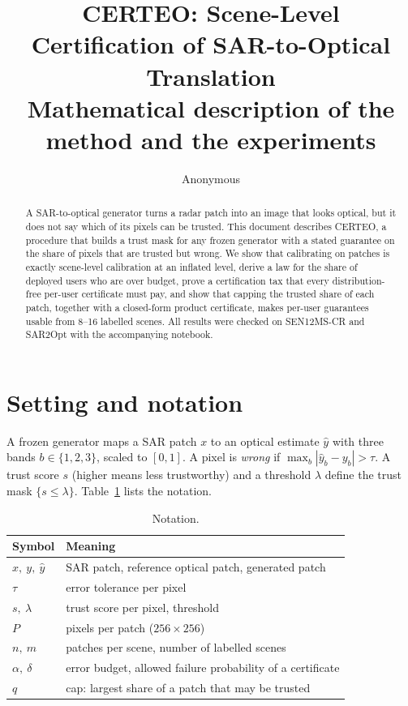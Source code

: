 \documentclass[11pt,a4paper]{article}
\title{CERTEO: Scene-Level Certification of SAR-to-Optical Translation\\[0.4ex]
\large Mathematical description of the method and the experiments}
\author{Anonymous}
\date{}
\theoremstyle{definition}
\theoremstyle{remark}
\newcommand{\1}{\mathbf{1}}
\begin{document}
\maketitle

\begin{abstract}
A SAR-to-optical generator turns a radar patch into an image that looks optical, but it does not say which of its pixels can be trusted. This document describes CERTEO, a procedure that builds a trust mask for any frozen generator with a stated guarantee on the share of pixels that are trusted but wrong. We show that calibrating on patches is exactly scene-level calibration at an inflated level, derive a law for the share of deployed users who are over budget, prove a certification tax that every distribution-free per-user certificate must pay, and show that capping the trusted share of each patch, together with a closed-form product certificate, makes per-user guarantees usable from 8--16 labelled scenes. All results were checked on SEN12MS-CR and SAR2Opt with the accompanying notebook.
\end{abstract}

\tableofcontents

\section{Setting and notation}

A frozen generator maps a SAR patch $x$ to an optical estimate $\hat y$ with three bands $b\in\{1,2,3\}$, scaled to $[0,1]$. A pixel is \emph{wrong} if $\max_b|\hat y_b-y_b|>\tau$. A trust score $s$ (higher means less trustworthy) and a threshold $\lambda$ define the trust mask $\{s\le\lambda\}$. Table~\ref{tab:notation} lists the notation.

\begin{table}[htbp]
\centering
\caption{Notation.}
\label{tab:notation}
\begin{tabular}{@{}ll@{}}
\toprule
Symbol & Meaning\\
\midrule
$x,\ y,\ \hat y$ & SAR patch, reference optical patch, generated patch\\
$\tau$ & error tolerance per pixel\\
$s,\ \lambda$ & trust score per pixel, threshold\\
$P$ & pixels per patch ($256\times256$)\\
$n,\ m$ & patches per scene, number of labelled scenes\\
$\alpha,\ \delta$ & error budget, allowed failure probability of a certificate\\
$q$ & cap: largest share of a patch that may be trusted\\
\bottomrule
\end{tabular}
\end{table}
\end{document}

